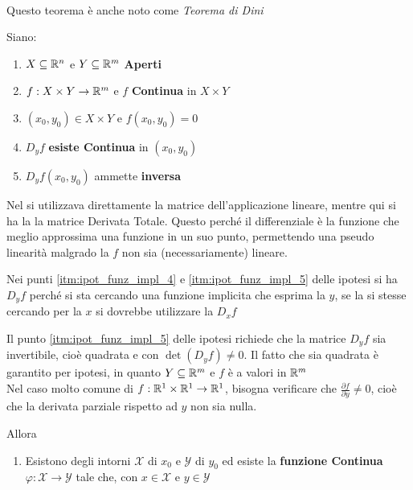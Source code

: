 \begin{theorem}~
	\label{teo:funz_impl}
	\vspace*{-\baselineskip}
	\begin{note}
		Questo teorema è anche noto come \textit{Teorema di Dini}
	\end{note}
	Siano:
	\begin{enumerate}[noitemsep]
		\item \label{itm:ipot_funz_impl_1} $X \subseteq \mathbb{R}^n$ e $Y \subseteq \mathbb{R}^m$ \textbf{Aperti}
		\item \label{itm:ipot_funz_impl_2} $f: X \times Y \to \mathbb{R}^m$ e $f$ \textbf{Continua} in $X \times Y$
		\item \label{itm:ipot_funz_impl_3} $(x_0, y_0) \in X \times Y$ e $f(x_0, y_0) = 0$
		\item \label{itm:ipot_funz_impl_4} $D_yf$ \textbf{esiste Continua} in $(x_0, y_0)$
		\item \label{itm:ipot_funz_impl_5} $D_yf(x_0, y_0)$ ammette \textbf{inversa}
	\end{enumerate}
	\begin{note}
		\hypertarget{note:teo_funz_impl_note_ipot1}{}
		Nel  si utilizzava direttamente la matrice dell'applicazione lineare, mentre qui si ha la la matrice Derivata Totale. Questo perché il differenziale è la funzione che meglio approssima una funzione in un suo punto, permettendo una pseudo linearità malgrado la $f$ non sia (necessariamente) lineare.
	\end{note}
	\begin{note}
		Nei punti \ref{itm:ipot_funz_impl_4} e \ref{itm:ipot_funz_impl_5} delle ipotesi si ha $D_yf$ perché si sta cercando una funzione implicita che esprima la $y$, se la si stesse cercando per la $x$ si dovrebbe utilizzare la $D_xf$
	\end{note}
	\begin{note}
		Il punto \ref{itm:ipot_funz_impl_5} delle ipotesi richiede che la matrice $D_yf$ sia invertibile, cioè quadrata e con $\det(D_yf) \neq 0$. Il fatto che sia quadrata è garantito per ipotesi, in quanto $Y \subseteq \mathbb{R}^m$ e $f$ è a valori in $\mathbb{R}^m$\\
		Nel caso molto comune di $f: \mathbb{R}^1 \times \mathbb{R}^1 \to \mathbb{R}^1$, bisogna verificare che $\frac{\partial f}{\partial y} \neq 0$, cioè che la derivata parziale rispetto ad $y$ non sia nulla.
	\end{note}
	Allora
	\begin{enumerate}
		\item Esistono degli intorni $\mathcal{X}$ di $x_0$ e $\mathcal{Y}$ di $y_0$ ed esiste la \textbf{funzione Continua} $\varphi: \mathcal{X} \to \mathcal{Y}$ tale che, con $x \in \mathcal{X}$ e $y \in \mathcal{Y}$

\end{enumerate}
\end{theorem}
